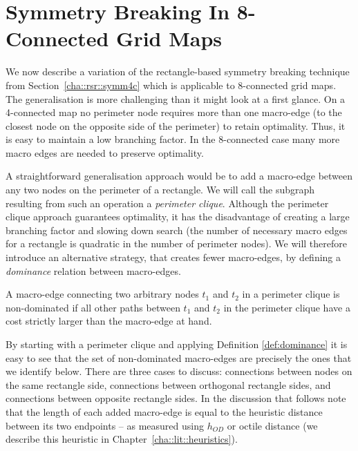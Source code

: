 \section{Symmetry Breaking In 8-Connected Grid Maps}
\label{cha::rsr::symm8c}
We now describe a variation of the rectangle-based symmetry breaking technique
from Section~\ref{cha::rsr::symm4c} which is applicable to 8-connected grid
maps.  The generalisation is more challenging than it might look at a first
glance.  On a 4-connected map no perimeter node requires more than one
macro-edge (to the closest node on the opposite side of the perimeter) to
retain optimality.  Thus, it is easy to maintain a low branching factor.  In
the 8-connected case many more macro edges are needed to preserve optimality.

A straightforward generalisation approach would be to add a macro-edge between
any two nodes on the perimeter of a rectangle.  We will call the subgraph
resulting from such an operation a \emph{perimeter clique}.  Although the
perimeter clique approach guarantees optimality, it has the disadvantage of
creating a large branching factor and slowing down search (the number of
necessary macro edges for a rectangle is quadratic in the number of perimeter
nodes).  We will therefore introduce an alternative strategy, that creates
fewer macro-edges, by defining a \emph{dominance} relation between
macro-edges.

\begin{definition}
\label{def:dominance}
A macro-edge connecting two arbitrary nodes $t_1$ and $t_2$ in a perimeter
clique is non-dominated if all other paths between $t_1$ and $t_2$ in the
perimeter clique have a cost strictly larger than the macro-edge at hand.
\end{definition}

By starting with a perimeter clique and applying Definition
\ref{def:dominance} it is easy to see that the set of non-dominated
macro-edges are precisely the ones that we identify below.  There are three
cases to discuss: connections between nodes on the same rectangle side,
connections between orthogonal rectangle sides, and connections between
opposite rectangle sides.  In the discussion that follows note that the length
of each added macro-edge is equal to the heuristic distance between its two
endpoints -- as measured using $h_{OD}$ or octile distance 
(we describe this heuristic in Chapter~\ref{cha::lit::heuristics}).

